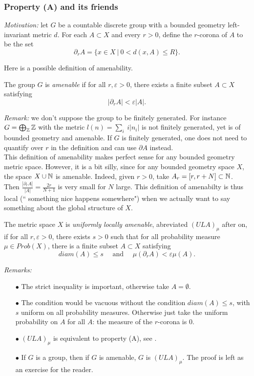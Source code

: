 \subsubsection*{Property (A) and its friends}
\textit{Motivation:} let $G$ be a countable discrete group with a bounded geometry left-invariant metric $d$. For each $A\subset X$ and every $r>0$, define the $r$-corona of $A$ to be the set
\[\partial_r A = \{x \in X \ | \ 0< d(x,A) \leq R\}.\]

Here is a possible definition of amenability.

\begin{definition}
The group $G$ is \textit{amenable} if for all $r,\varepsilon>0$, there exists a finite subset $A\subset X$ satisfying 
\[ | \partial_r A | < \varepsilon |A|.\] 
\end{definition}

\textit{Remark:} we don't suppose the group to be finitely generated. For instance $G= \bigoplus_\mathbb Z \mathbb Z$ with the metric $l(n) = \sum_i \ i |n_i|$ is not finitely generated, yet is of bounded geometry and amenable. If $G$ is finitely generated, one does not need to quantify over $r$ in the definition and can use $\partial A$ instead.\\

This definition of amenability makes perfect sense for any bounded geometry metric space. However, it is a bit silly, since for any bounded geometry space $X$, the space $X \cup \mathbb N$ is amenable. Indeed, given $r>0$, take $A_r = [r,r+N]\subset \mathbb N$. Then $\frac{| \partial_r A | }{|A| } = \frac{2r}{N+1}$ is very small for $N$ large. This definition of amenabilty is thus local (`` something nice happens somewhere") when we actually want to say something about the global structure of $X$.

\begin{definition}
The metric space $X$ is \textit{uniformly locally amenable}, abreviated $(ULA)_\mu$ after on, if for all $r,\varepsilon>0$, there exists $s>0$ such that for all probability measure $\mu \in Prob(X)$, there is a finite subset $A\subset X$ satisfying 
\[ diam(A)\leq s \quad \text{ and } \quad \mu( \partial_r A ) < \varepsilon \mu(A).\] 
\end{definition}

\textit{Remarks:}
\begin{itemize}
\item[$\bullet$] The strict inequality is important, otherwise take $A=\emptyset$.
\item[$\bullet$] The condition would be vacuous without the condition $diam (A) \leq s$, with $s$ uniform on all probability measures. Otherwise just take the uniform probability on $A$ for all $A$: the measure of the $r$-corona is $0$.  
\item[$\bullet$] $(ULA)_\mu$ is equivalent to property (A), see \cite{BNSWW}.
\item[$\bullet$] If $G$ is a group, then if $G$ is amenable, $G$ is $(ULA)_\mu$. The proof is left as an exercise for the reader.
\end{itemize}

